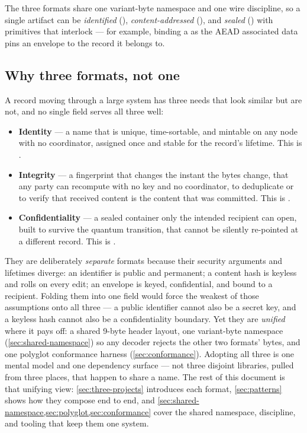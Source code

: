 The three formats share one variant-byte namespace and one wire discipline, so a single artifact can be \emph{identified} (\tesseraid{}), \emph{content-addressed} (\tesserahash{}), and \emph{sealed} (\tesseraseal{}) with primitives that interlock --- for example, binding a \tesseraid{} as the AEAD associated data pins an envelope to the record it belongs to.

\subsection{Why three formats, not one}

A record moving through a large system has three needs that look similar but are not, and no single field serves all three well:

\begin{itemize}
\item \textbf{Identity} --- a name that is unique, time-sortable, and mintable on any node with no coordinator, assigned once and stable for the record's lifetime. This is \tesseraid{}.
\item \textbf{Integrity} --- a fingerprint that changes the instant the bytes change, that any party can recompute with no key and no coordinator, to deduplicate or to verify that received content is the content that was committed. This is \tesserahash{}.
\item \textbf{Confidentiality} --- a sealed container only the intended recipient can open, built to survive the quantum transition, that cannot be silently re-pointed at a different record. This is \tesseraseal{}.
\end{itemize}

They are deliberately \emph{separate} formats because their security arguments and lifetimes diverge: an identifier is public and permanent; a content hash is keyless and rolls on every edit; an envelope is keyed, confidential, and bound to a recipient. Folding them into one field would force the weakest of those assumptions onto all three --- a public identifier cannot also be a secret key, and a keyless hash cannot also be a confidentiality boundary. Yet they are \emph{unified} where it pays off: a shared 9-byte header layout, one variant-byte namespace (\cref{sec:shared-namespace}) so any decoder rejects the other two formats' bytes, and one polyglot conformance harness (\cref{sec:conformance}). Adopting all three is one mental model and one dependency surface --- not three disjoint libraries, pulled from three places, that happen to share a name. The rest of this document is that unifying view: \cref{sec:three-projects} introduces each format, \cref{sec:patterns} shows how they compose end to end, and \cref{sec:shared-namespace,sec:polyglot,sec:conformance} cover the shared namespace, discipline, and tooling that keep them one system.
